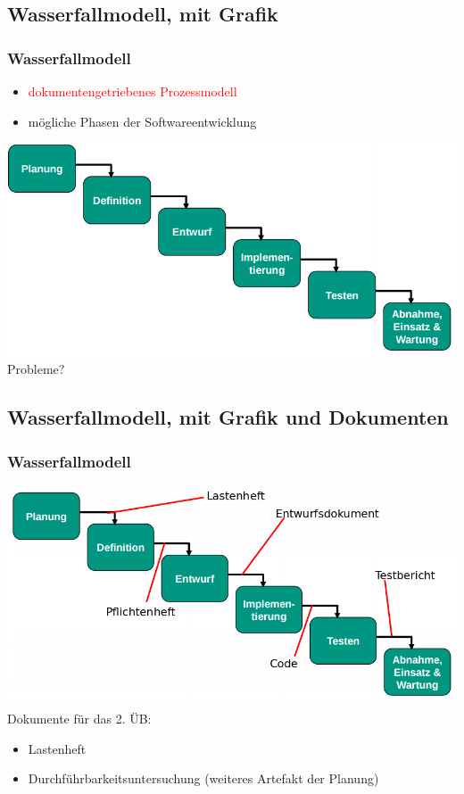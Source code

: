 \documentclass[18pt]{beamer}
\begin{document}
	\subsection{Wasserfallmodell, mit Grafik}
	\begin{frame}
		\frametitle{Wasserfallmodell}
		\begin{itemize}
			\item \textcolor{red}{dokumentengetriebenes Prozessmodell} \pause
			\item mögliche Phasen der Softwareentwicklung \pause
		\end{itemize}
		\includegraphics[scale=0.4]{./pics/tut1/waterfall_without-docs.png}
		\pause
		Probleme?
	\end{frame}
	
	\subsection{Wasserfallmodell, mit Grafik und Dokumenten}
	\begin{frame}
		\frametitle{Wasserfallmodell}
		\includegraphics[scale=0.4]{./pics/tut1/waterfall_with-docs.png}
		\pause
		Dokumente für das 2. ÜB: 
		\begin{itemize}
			\item Lastenheft
			\item Durchführbarkeitsuntersuchung (weiteres Artefakt der Planung)
		\end{itemize}
	\end{frame}
\end{document}
